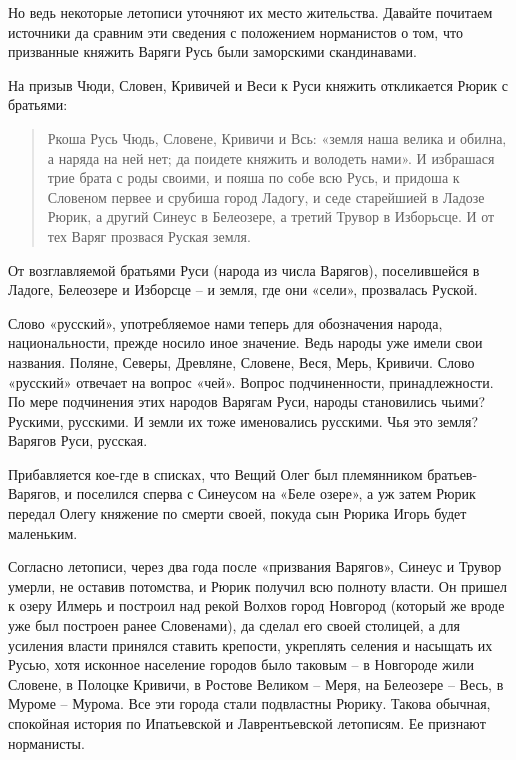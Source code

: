 Но ведь некоторые летописи уточняют их место жительства. Давайте почитаем источники да сравним эти сведения с положением норманистов о том, что призванные княжить Варяги Русь были заморскими скандинавами.

На призыв Чюди, Словен, Кривичей и Веси к Руси княжить откликается Рюрик с братьями:

\begin{quotation} 
Ркоша Русь Чюдь, Словене, Кривичи и Всь: «земля наша велика и обилна, а наряда на ней нет; да поидете княжить и володеть нами». И избрашася трие брата с роды своими, и пояша по собе всю Русь, и придоша к Словеном первее и срубиша город Ладогу, и седе старейшией в Ладозе Рюрик, а другий Синеус в Белеозере, а третий Трувор в Изборьсце. И от тех Варяг прозвася Руская земля.
\end{quotation} 

От возглавляемой братьями Руси (народа из числа Варягов), поселившейся в Ладоге, Белеозере и Изборсце – и земля, где они «сели», прозвалась Руской.

Слово «русский», употребляемое нами теперь для обозначения народа, национальности, прежде носило иное значение. Ведь народы уже имели свои названия. Поляне, Северы, Древляне, Словене, Веся, Мерь, Кривичи. Слово «русский» отвечает на вопрос «чей». Вопрос подчиненности, принадлежности. По мере подчинения этих народов Варягам Руси, народы становились чьими? Рускими, русскими. И земли их тоже именовались русскими. Чья это земля? Варягов Руси, русская.

Прибавляется кое-где в списках, что Вещий Олег был племянником братьев-Варягов, и поселился сперва с Синеусом на «Беле озере», а уж затем Рюрик передал Олегу княжение по смерти своей, покуда сын Рюрика Игорь будет маленьким. 

Согласно летописи, через два года после «призвания Варягов», Синеус и Трувор умерли, не оставив потомства, и Рюрик получил всю полноту власти. Он пришел к озеру Илмерь и построил над рекой Волхов город Новгород (который же вроде уже был построен ранее Словенами), да сделал его своей столицей, а для усиления власти принялся ставить крепости, укреплять селения и насыщать их Русью, хотя исконное население городов было таковым – в Новгороде жили Словене, в Полоцке Кривичи, в Ростове Великом – Меря, на Белеозере – Весь, в Муроме – Мурома. Все эти города стали подвластны Рюрику. Такова обычная, спокойная история по Ипатьевской и Лаврентьевской летописям. Ее признают норманисты.


